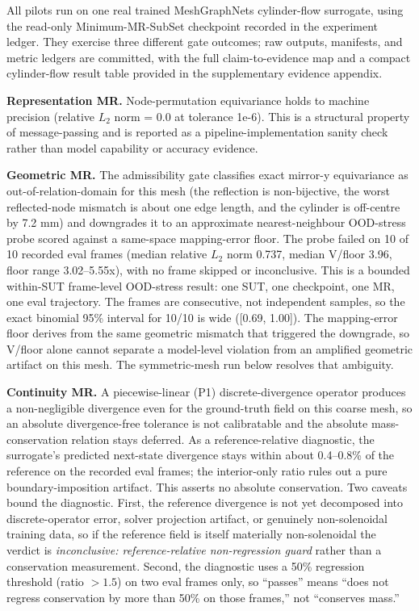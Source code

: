 \documentclass[preprint,12pt,authoryear]{elsarticle}
\begin{document}
All pilots run on one real trained MeshGraphNets cylinder-flow surrogate, using the read-only Minimum-MR-SubSet checkpoint recorded in the experiment ledger. They exercise three different gate outcomes; raw outputs, manifests, and metric ledgers are committed, with the full claim-to-evidence map and a compact cylinder-flow result table provided in the supplementary evidence appendix.

\textbf{Representation MR.} Node-permutation equivariance holds to machine precision (relative \(L_2\) norm = 0.0 at tolerance 1e-6). This is a structural property of message-passing and is reported as a pipeline-implementation sanity check rather than model capability or accuracy evidence.

\textbf{Geometric MR.} The admissibility gate classifies exact mirror-y equivariance as out-of-relation-domain for this mesh (the reflection is non-bijective, the worst reflected-node mismatch is about one edge length, and the cylinder is off-centre by 7.2 mm) and downgrades it to an approximate nearest-neighbour OOD-stress probe scored against a same-space mapping-error floor. The probe failed on 10 of 10 recorded eval frames (median relative \(L_2\) norm 0.737, median V/floor 3.96, floor range 3.02--5.55x), with no frame skipped or inconclusive. This is a bounded within-SUT frame-level OOD-stress result: one SUT, one checkpoint, one MR, one eval trajectory. The frames are consecutive, not independent samples, so the exact binomial 95\% interval for 10/10 is wide ([0.69, 1.00]). The mapping-error floor derives from the same geometric mismatch that triggered the downgrade, so V/floor alone cannot separate a model-level violation from an amplified geometric artifact on this mesh. The symmetric-mesh run below resolves that ambiguity.

\textbf{Continuity MR.} A piecewise-linear (P1) discrete-divergence operator produces a non-negligible divergence even for the ground-truth field on this coarse mesh, so an absolute divergence-free tolerance is not calibratable and the absolute mass-conservation relation stays deferred. As a reference-relative diagnostic, the surrogate's predicted next-state divergence stays within about 0.4--0.8\% of the reference on the recorded eval frames; the interior-only ratio rules out a pure boundary-imposition artifact. This asserts no absolute conservation. Two caveats bound the diagnostic. First, the reference divergence is not yet decomposed into discrete-operator error, solver projection artifact, or genuinely non-solenoidal training data, so if the reference field is itself materially non-solenoidal the verdict is \emph{inconclusive: reference-relative non-regression guard} rather than a conservation measurement. Second, the diagnostic uses a 50\% regression threshold (ratio $>1.5$) on two eval frames only, so ``passes'' means ``does not regress conservation by more than 50\% on those frames,'' not ``conserves mass.''
\end{document}
